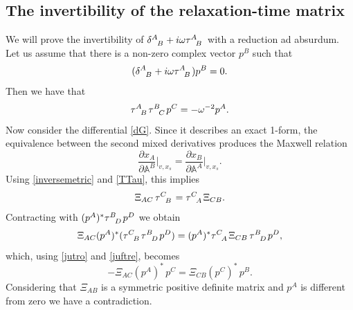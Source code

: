 \documentclass[useAMS,usenatbib,prd,twocolumn,nofootinbib]{revtex4-1}
\begin{document}
\subsection{The invertibility of the relaxation-time matrix}\label{TIOTTM}

We will prove the invertibility of $\delta\indices{^A _B} + i \omega \tau\indices{^A _B}$ with a reduction ad absurdum. Let us assume that there is a non-zero complex vector $p^B$ such that
\begin{equation}\label{jutro}
(\delta\indices{^A _B} + i \omega \tau\indices{^A _B})p^B =0.
\end{equation}
Then we have that
\begin{equation}\label{juftre}
\tau\indices{^A _B} \tau\indices{^B _C} p^C =- \omega^{-2} p^A.
\end{equation}
Now consider the differential \eqref{dG}. Since it describes an exact 1-form, the equivalence between the second mixed derivatives produces the Maxwell relation
\begin{equation}
\dfrac{\partial x_A}{\partial \mathbb{A}^B} \bigg|_{v,x_s} = \dfrac{\partial x_B}{\partial \mathbb{A}^A} \bigg|_{v,x_s} .
\end{equation}
Using \eqref{inversemetric} and \eqref{TTau}, this implies
\begin{equation}
\Xi_{AC} \, \tau\indices{^C _B} = \tau\indices{^C _A} \Xi_{CB}.
\end{equation}
Contracting with $(p^A)^* \tau\indices{^B _D} p^D$ we obtain
\begin{equation}
 \Xi_{AC} (p^A)^* (\tau\indices{^C _B} \tau\indices{^B _D} p^D) = (p^A)^* \tau\indices{^C _A} \Xi_{CB} \, \tau\indices{^B _D} p^D,
\end{equation}
which, using \eqref{jutro} and \eqref{juftre}, becomes
\begin{equation}
- \Xi_{AC} (p^A)^* \, p^C = \Xi_{CB} (  p^C)^* \, p^B.
\end{equation}
Considering that $\Xi_{AB}$ is a symmetric positive definite matrix and $p^A$ is different from zero we have a contradiction.
\end{document}
